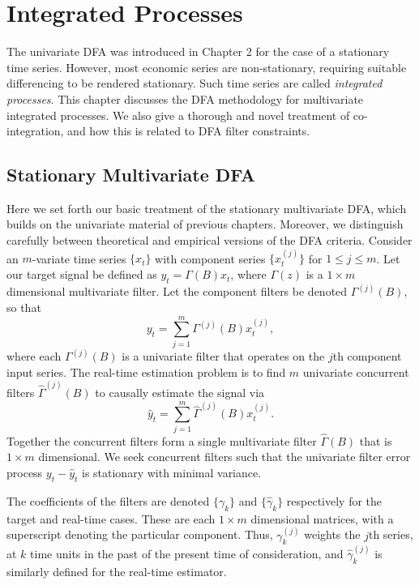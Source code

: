 \documentclass[a4paper]{book}
\def\eqinlaw{\stackrel{{\cal L}}{=}}
\def\tends{\rightarrow}
\def\tendsinf{\rightarrow\infty}
\def\isodynamo{\Leftrightarrow}
\begin{document}
\def\eqinlaw{\stackrel{{\cal L}}{=}}
\def\tends{\rightarrow}
\def\tendsinf{\rightarrow\infty}
\def\isodynamo{\Leftrightarrow}





\chapter{Integrated Processes}\label{int_sec}


The univariate DFA was introduced in Chapter 2 for the case of a stationary time series.  
However, most economic series are non-stationary, requiring suitable differencing to be
rendered stationary.  Such time series are called {\it integrated processes}.  This chapter discusses the
DFA methodology for multivariate integrated processes.  We also give a thorough and novel treatment
of co-integration, and how this is related to DFA filter constraints.

\section{Stationary Multivariate DFA}

Here we set forth our basic treatment of the stationary multivariate DFA, which builds on the univariate material 
of previous chapters.  Moreover, we distinguish carefully between theoretical and empirical versions of the DFA
criteria.  Consider an $m$-variate time series $\{ x_t \}$  with component
series $\{ x_t^{(j)} \}$ for $1 \leq j \leq m$.    Let our target
signal be defined as $y_t = \Gamma (B) x_t$, where $\Gamma (z)$ is a $1
\times m$ dimensional multivariate filter.  Let the component 
filters be denoted $\Gamma^{(j)} (B)$, so that
\[
  y_t = \sum_{j=1}^m \Gamma^{(j)} (B) x_t^{(j)},
\]
 where each $\Gamma^{(j)} (B)$ is a univariate filter that operates on the $j$th component input series. 
 The real-time estimation problem is to find $m$ univariate concurrent
filters $\widehat{\Gamma}^{(j)} (B)$ to causally estimate the signal via
\[
 \widehat{y}_t = \sum_{j=1}^m \widehat{\Gamma}^{(j)} (B) x_t^{(j)}.
\]
 Together the concurrent filters form a single multivariate filter
 $\widehat{\Gamma} (B)$ that is $1 \times m$ dimensional.  We seek concurrent
 filters such that the univariate filter error process $y_t - \widehat{y}_t$ is
 stationary with minimal variance. 

The coefficients of the filters are denoted $\{ \gamma_k \}$ and $\{ \widehat{\gamma}_k \}$ respectively for 
the target and real-time cases.  These are each $1 \times m$ dimensional matrices, with a superscript denoting the particular component.
Thus, $\gamma_k^{(j)}$ weights the $j$th series, at $k$ time units in the past of the present time of consideration, and
$\widehat{\gamma}_k^{(j)}$ is similarly defined for the real-time estimator.
\end{document}
